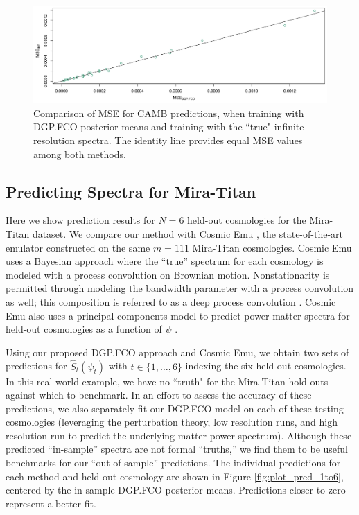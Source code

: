 \documentclass[11pt]{article}
\begin{document}
\begin{figure}
    \centering
    \includegraphics[width=\textwidth]{mse_dot.jpeg}
    \caption{Comparison of MSE for CAMB predictions, when training with DGP.FCO posterior 
             means and training with the ``true" infinite-resolution spectra. The identity line 
             provides equal MSE values among both methods.}   
    \label{fig:mse_camb}
\end{figure}

\subsection{Predicting Spectra for Mira-Titan}
\label{subsec:mira_pred}

Here we show prediction results for $N=6$ held-out cosmologies for the Mira-Titan dataset. 
We compare our method with Cosmic Emu \citep{moran2023mira}, the state-of-the-art emulator 
constructed on the same $m=111$ Mira-Titan cosmologies. Cosmic Emu uses a Bayesian approach 
where the ``true'' spectrum for each cosmology is modeled with a process convolution on Brownian motion. 
Nonstationarity is permitted through modeling the bandwidth parameter with a process 
convolution as well; this composition is referred to as a deep process convolution 
\citep[DPC;][]{moran2023mira}. Cosmic Emu also uses a principal components model to predict power matter 
spectra for held-out cosmologies as a function of $\psi$ \citep{gattiker2020sepia}.

Using our proposed DGP.FCO approach and Cosmic Emu, we obtain two sets of predictions for $\hat{S}_t(\psi_t)$ 
with $t\in\{1,\ldots,6\}$ indexing the six held-out cosmologies.  In this real-world example, we have
no ``truth" for the Mira-Titan hold-outs against which to benchmark. In an effort to assess the 
accuracy of these predictions, we also separately fit our DGP.FCO model on each of these testing cosmologies
(leveraging the perturbation theory, low resolution runs, and high resolution run to predict the underlying
matter power spectrum).  Although these predicted ``in-sample'' spectra are not formal ``truths,'' we find them to be
useful benchmarks for our ``out-of-sample'' predictions.  The individual predictions for each method and 
held-out cosmology are shown in Figure \ref{fig:plot_pred_1to6}, centered by the in-sample DGP.FCO
posterior means.  Predictions closer to zero represent a better fit. 
\end{document}
